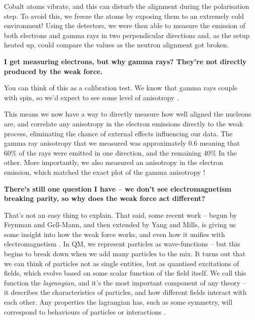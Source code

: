 \documentclass{article}
\newcommand{\q}[1]{\vspace{10pt}
\textbf{#1}
\vspace{0pt}}
\begin{document}
\begin{multicols}{2}
\begin{window}[2,r,\texttt{[image: \{"./images/wu-setup"]}.png},
\textit{\footnotesize Diagram of the setup \cite{C3} \vspace{5pt}}
]
Cobalt atoms vibrate, and this can disturb the alignment during the polarisation step. To avoid this, we freeze the atoms by exposing them to an extremely cold environment!
Using the detectors, we were then able to measure the emission of both electrons and gamma rays in two perpendicular directions and, as the setup heated up, could compare the values as the neutron alignment got broken.
\end{window}
\begin{window}[1,r,\texttt{[image: \{"./images/wu-results"]}.png},
\textit{\footnotesize Experimental data from Wu’s experiment – the anisotropy in emission of electrons (bottom) perfectly matches that in the emission of gamma rays (top) \cite{C3} \vspace{5pt}}]
\q{I get measuring electrons, but why gamma rays? They’re not directly produced by the weak force.}

You can think of this as a calibration test. We know that gamma rays couple with spin, so we’d expect to see some level of anisotropy \cite{J3}.

This means we now have a way to directly measure how well aligned the nucleons are, and correlate any anisotropy in the electron emissions directly to the weak process, eliminating the chance of external effects influencing our data.
The gamma ray anisotropy that we measured was approximately 0.6 meaning that 60\% of the rays were emitted in one direction, and the remaining 40\% In the other. More importantly, we also measured an anisotropy in the electron emission, which matched the exact plot of the gamma anisotropy \cite{C3}!
\end{window}

\q{There’s still one question I have – we don’t see electromagnetism breaking parity, so why does the weak force act different?}

That’s not an easy thing to explain. That said, some recent work – begun by Feynman and Gell-Mann, and then extended by Yang and Mills, is giving us some insight into how the weak force works, and even how it unifies with electromagnetism \cite{J2}. In QM, we represent particles as wave-functions – but this begins to break down when we add many particles to the mix. It turns out that we can think of particles not as single entities, but as quantised excitations of fields, which evolve based on some scalar function of the field itself. We call this function the \textit{lagrangian}, and it’s the most important component of any theory – it describes the characteristics of particles, and how different fields interact with each other. Any properties the lagrangian has, such as some symmetry, will correspond to behaviours of particles or interactions \cite{J1}.


\end{multicols}
\end{document}

